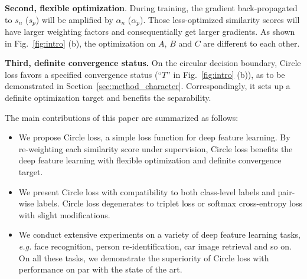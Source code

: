 \documentclass[10pt,twocolumn,letterpaper]{article}
\begin{document}
\textbf{Second, flexible optimization}. During training, the gradient back-propagated to $s_n$ ($s_p$) will be amplified by $\alpha_n$ ($\alpha_p$). Those less-optimized similarity scores will have larger weighting factors and consequentially get larger gradients. As shown in Fig.~\ref{fig:intro} (b), the optimization on $A$, $B$ and $C$ are different to each other.



\textbf{Third, definite convergence status.} %
On the circular decision boundary, Circle loss favors a specified convergence status (``$T$'' in Fig.~\ref{fig:intro} (b)), as to be demonstrated in Section~\ref{sec:method_character}. Correspondingly, it sets up a definite optimization target and benefits the separability. 




The main contributions of this paper are summarized as follows:
\begin {itemize}
\item We propose Circle loss, a simple loss function for deep feature learning. By re-weighting each similarity score under supervision, Circle loss benefits the deep feature learning with flexible optimization and definite convergence target. 
\item We present Circle loss with compatibility to both class-level labels and pair-wise labels. Circle loss degenerates to triplet loss or softmax cross-entropy loss with slight modifications. %
\item We conduct extensive experiments on a variety of deep feature learning tasks, \emph{e.g.} face recognition, person re-identification, car image retrieval and so on. On all these tasks, we demonstrate the superiority of Circle loss with performance on par with the state of the art. 
\end {itemize}



\end{document}
